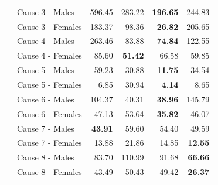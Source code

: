 \begin{center}
\begin{small}
\begin{longtable}{@{}llrrrr@{}}
& Cause 3 - Males & 596.45 & 283.22 & \textbf{196.65} & 244.83 \\
& Cause 3 - Females & 183.37 & 98.36 & \textbf{26.82} & 205.65 \\
& Cause 4 - Males & 263.46 & 83.88 & \textbf{74.84} & 122.55 \\
& Cause 4 - Females & 85.60 & \textbf{51.42} & 66.58 & 59.85 \\
& Cause 5 - Males & 59.23 & 30.88 & \textbf{11.75} & 34.54 \\
& Cause 5 - Females & 6.85 & 30.94 & \textbf{4.14} & 8.65 \\
& Cause 6 - Males & 104.37 & 40.31 & \textbf{38.96} & 145.79 \\
& Cause 6 - Females & 47.13 & 53.64 & \textbf{35.82} & 46.07 \\
& Cause 7 - Males & \textbf{43.91} & 59.60 & 54.40 & 49.59 \\
& Cause 7 - Females & 13.88 & 21.86 & 14.85 & \textbf{12.55} \\
& Cause 8 - Males & 83.70 & 110.99 & 91.68 & \textbf{66.66} \\
& Cause 8 - Females & 43.49 & 50.43 & 49.42 & \textbf{26.37} \\
\bottomrule
\end{longtable}
\end{small}
\end{center}
